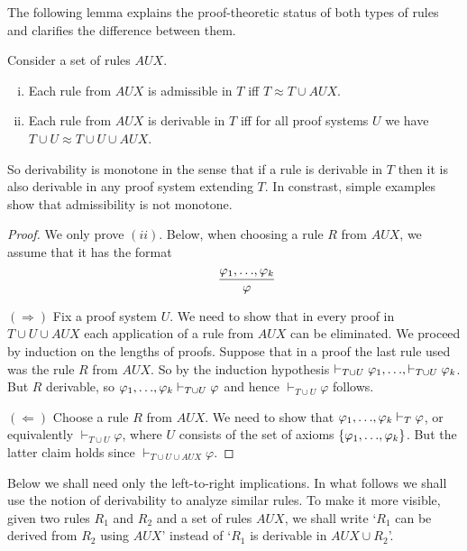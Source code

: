 \documentclass[runningheads]{llncs}       %
\newcommand{\AUX}{\mathit{AUX}}
\begin{document}
The following lemma explains the proof-theoretic status of both types
of rules and clarifies the difference between them.

\begin{lemma} \label{lem:AUX}
  Consider a set of rules $\AUX$.
  \begin{enumerate}[(i)]
  \item 
  Each rule from $\AUX$ is admissible in $T$ iff $T \approx T \cup \AUX$. 

\item Each rule from $\AUX$ is derivable in $T$ iff for all proof
  systems $U$ we have $T \cup U \approx T \cup U \cup \AUX$.

\end{enumerate}
\end{lemma}

So derivability is monotone in the sense that if a rule is derivable
in $T$ then it is also derivable in any proof system extending $T$. In
constrast, simple examples show that admissibility is not monotone.

\begin{proof}
  We only prove $(ii)$.
Below, when choosing a rule $R$ from $\AUX$, we assume that it has the format
\[ 
 \qquad \frac{\varphi_1,\mbox{$\ldots$},\varphi_k}{\varphi}
\]

\III

\NI
$(\Rightarrow)$ Fix a proof system $U$.  We need to show that in every
proof in $T \cup U \cup \AUX$ each application of a rule from $\AUX$
can be eliminated.  We proceed by induction on the lengths of
proofs. Suppose that in a proof the last rule used was the rule $R$ from $\AUX$.
So by the induction hypothesis
$ \vdash_{T \cup U} \varphi_1, \mbox{$\ldots$}, \vdash_{T \cup U} \varphi_k$.  But $R$
derivable, so 
$\varphi_1, \mbox{$\ldots$}, \varphi_k \vdash_{T \cup U} \varphi$ and hence
$\vdash_{T \cup U} \varphi$ follows.

\III

\NI
$(\Leftarrow)$ Choose a rule $R$ from $\AUX$.
We need to show that
$\varphi_1, \mbox{$\ldots$}, \varphi_k \vdash_T \varphi$, or equivalently
$\vdash_{T \cup U} \varphi$, where $U$ consists of the set of axioms
$\mbox{$\{{\varphi_1,\mbox{$\ldots$},\varphi_k}\}$}$.  But the latter claim holds since
$\vdash_{T \cup U \cup \AUX} \varphi$.
\HB
\end{proof}

Below we shall need only the left-to-right implications.  In what
follows we shall use the notion of derivability to analyze similar
rules. To make it more visible, given two rules $R_1$ and $R_2$ and a
set of rules $\AUX$, we shall write `$R_1$ can be derived from $R_2$
using $\AUX$' instead of `$R_1$ is derivable in $\AUX \cup R_2$'.
\end{document}
